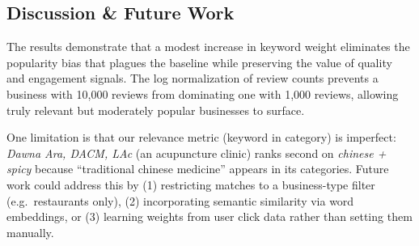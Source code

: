 \subsection{Discussion \& Future Work}

The results demonstrate that a modest increase in keyword weight
eliminates the popularity bias that plagues the baseline while
preserving the value of quality and engagement signals.
The log normalization of review counts prevents a business with
10,000 reviews from dominating one with 1,000 reviews, allowing
truly relevant but moderately popular businesses to surface.

One limitation is that our relevance metric (keyword in category)
is imperfect: \textit{Dawna Ara, DACM, LAc} (an acupuncture clinic)
ranks second on \textit{chinese + spicy} because ``traditional chinese
medicine'' appears in its categories.
Future work could address this by (1) restricting matches to a
business-type filter (e.g.\ restaurants only), (2) incorporating
semantic similarity via word embeddings, or (3) learning weights
from user click data rather than setting them manually.

